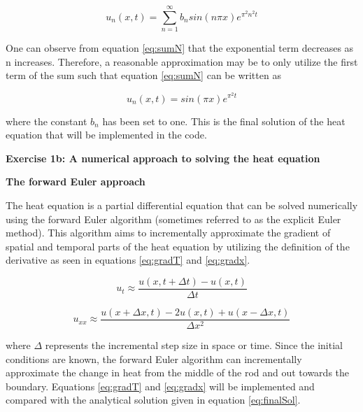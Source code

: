 \documentclass[12pt,a4paper]{article}
\begin{document}
\begin{equation}\label{eq:sumN}
u_n(x,t) = \sum_{n=1}^{\infty} b_n sin(n\pi x)e^{\pi^2 n^2 t}
\end{equation}

\noindent One can observe from equation \ref{eq:sumN} that the exponential term decreases as n increases. Therefore, a reasonable approximation may be to only utilize the first term of the sum such that equation \ref{eq:sumN} can be written as

\begin{equation}\label{eq:finalSol}
u_n(x,t) = sin(\pi x)e^{\pi^2 t}
\end{equation}

\noindent where the constant $b_n$ has been set to one. This is the final solution of the heat equation that will be implemented in the code.

\newpage

\begin{center}
\Large{\textbf{Exercise 1b: A numerical approach to solving the heat equation}}
\end{center}

\begin{center}
\large{\textbf{The forward Euler approach}}
\end{center}

\noindent The heat equation is a partial differential equation that can be solved numerically using the forward Euler algorithm (sometimes referred to as the explicit Euler method). This algorithm aims to incrementally approximate the gradient of spatial and temporal parts of the heat equation by utilizing the definition of the derivative as seen in equations \ref{eq:gradT} and \ref{eq:gradx}.

\begin{equation}\label{eq:gradT}
u_t \approx \frac{u(x, t+\Delta t) - u(x,t)}{\Delta t}
\end{equation}

\begin{equation}\label{eq:gradx}
u_{xx} \approx \frac{u(x + \Delta x, t) - 2u(x,t) + u(x-\Delta x,t)}{\Delta x^2}
\end{equation}

\noindent where $\Delta$ represents the incremental step size in space or time. Since the initial conditions are known, the forward Euler algorithm can incrementally approximate the change in heat from the middle of the rod and out towards the boundary. Equations \ref{eq:gradT} and \ref{eq:gradx} will be implemented and compared with the analytical solution given in equation \ref{eq:finalSol}.
\end{document}
